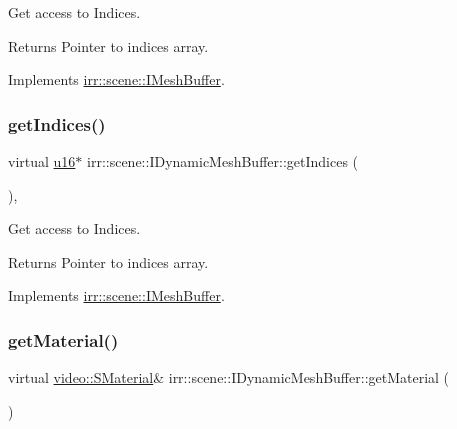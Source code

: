 Get access to Indices. 

\begin{DoxyReturn}{Returns}
Pointer to indices array. 
\end{DoxyReturn}


Implements \hyperlink{classirr_1_1scene_1_1IMeshBuffer_a3d33a561023314677361e30cf07ae429}{irr\+::scene\+::\+I\+Mesh\+Buffer}.

\mbox{\label{classirr_1_1scene_1_1IDynamicMeshBuffer_a556d8107ac44cbb16892f54370e32812}} 
\subsubsection{\texorpdfstring{get\+Indices()}{getIndices()}\hspace{0.1cm}{\footnotesize\ttfamily [4/4]}}
{\footnotesize\ttfamily virtual \hyperlink{namespaceirr_ae9f8ec82692ad3b83c21f555bfa70bcc}{u16}$\ast$ irr\+::scene\+::\+I\+Dynamic\+Mesh\+Buffer\+::get\+Indices (\begin{DoxyParamCaption}{ }\end{DoxyParamCaption})\hspace{0.3cm}{\ttfamily [inline]}, {\ttfamily [virtual]}}



Get access to Indices. 

\begin{DoxyReturn}{Returns}
Pointer to indices array. 
\end{DoxyReturn}


Implements \hyperlink{classirr_1_1scene_1_1IMeshBuffer_a3d33a561023314677361e30cf07ae429}{irr\+::scene\+::\+I\+Mesh\+Buffer}.

\mbox{\label{classirr_1_1scene_1_1IDynamicMeshBuffer_a6ed3a5ce948ebef063b7ea9e07974eb7}} 
\subsubsection{\texorpdfstring{get\+Material()}{getMaterial()}\hspace{0.1cm}{\footnotesize\ttfamily [1/4]}}
{\footnotesize\ttfamily virtual \hyperlink{classirr_1_1video_1_1SMaterial}{video\+::\+S\+Material}\& irr\+::scene\+::\+I\+Dynamic\+Mesh\+Buffer\+::get\+Material (\begin{DoxyParamCaption}{ }\end{DoxyParamCaption})\hspace{0.3cm}{\ttfamily [pure virtual]}}




